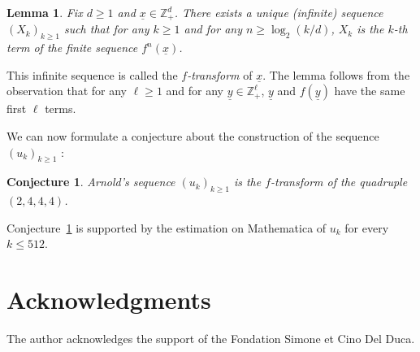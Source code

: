 \documentclass[12pt]{amsart}
\newcommand{\Z}{\mathbb Z}
\newtheorem{lem}[thm]{Lemma}
\newtheorem{conj}{Conjecture}
\begin{document}
\begin{lem}
Fix $d\geq1$ and $\underline{x}\in\Z_+^d$. There exists a unique (infinite) sequence $(X_k)_{k\geq 1}$ such that for any $k\geq1$ and for any $n\geq \log_2 (k/d)$, $X_k$ is the $k$-th term of the finite sequence $f^n(\underline{x})$.
\end{lem}

This infinite sequence is called the \emph{$f$-transform} of $\underline{x}$. The lemma follows from the observation that for any $\ell\geq1$ and for any $\underline{y}\in \Z_+^\ell$, $\underline{y}$ and $f(\underline{y})$ have the same first $\ell$ terms.

We can now formulate a conjecture about the construction of the sequence $(u_k)_{k\geq1}$ :
\begin{conj}
\label{conj:Arnold}
Arnold's sequence $(u_k)_{k\geq1}$ is the $f$-transform of the quadruple $(2,4,4,4)$.
\end{conj}
Conjecture~\ref{conj:Arnold} is supported by the estimation on Mathematica of $u_k$ for every $k\leq 512$.

\section*{Acknowledgments}

The author acknowledges the support of the Fondation Simone et Cino Del Duca.



\end{document}
